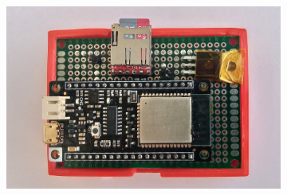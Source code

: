 \begin{figure}[h]
\centering
\begin{subfigure}[b]{0.6\textwidth}
    \centering
    \includegraphics[width=\textwidth]{figures/design/esp32.jpg}
\end{subfigure}
\begin{subfigure}[b]{0.2\textwidth}
    \centering

\end{subfigure}
\end{figure}
